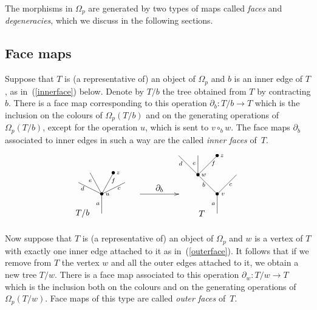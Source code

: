 \documentclass[a4paper]{amsart}
\theoremstyle{plain}
\theoremstyle{definition}
\theoremstyle{remark}
\newcommand{\rpd}{\Omega_p}
\newcommand{\To}{\longrightarrow}
\numberwithin{equation}{section}
\numberwithin{figure}{section}
\begin{document}
The morphisms in $\rpd$ are generated by two types of maps called \emph{faces} and
\emph{degeneracies}, which we discuss in the following sections.

\subsection{Face maps} Suppose that $T$ is (a representative of) an object of $\rpd$ and
$b$ is an inner edge of $T$, as in~(\ref{innerface}) below. Denote by $T/b$ the tree obtained from $T$ by contracting
$b$. There is a face map corresponding to this operation $\partial_b:T/b\To T$ which is the inclusion on the colours of $\Omega_p(T/b)$
and on the generating operations of $\Omega_p(T/b)$, except for the operation  $u$, which is sent to $v\circ_b w$.
The face maps $\partial_b$ associated to inner edges in such a way are the called \emph{inner faces} of~$T$.

\begin{equation}
    \xy<0.08cm,0cm>:
    (-12,-4)*=0{}="t1";
    (-6,1)*=0{}="t2";
    (6,1)*=0{\bullet}="t3";
    (12,-4)*=0{}="t4";
    (0,-10)*=0{\bullet}="t5";
    (0,-20)*=0{}="t6";
    (40,10)*=0{}="5";
    (50,10)*=0{}="6";
    (60,10)*=0{\bullet}="7";
    (50,0)*=0{\bullet}="8";
    (70,0)*=0{}="9";
    (60,-10)*=0{\bullet}="10";
    (60,-20)*=0{}="11";
    (-10,-7)*{\scriptstyle d};
    (-6,-3)*{\scriptstyle e};
    (6,-3)*{\scriptstyle f};
    (9,-7)*{\scriptstyle c};
    (-2,-15)*{\scriptstyle a};
    (3,-10)*{\scriptstyle u};
    (41,6)*{\scriptstyle d};
    (48,6)*{\scriptstyle e};
    (58,6)*{\scriptstyle f};
    (53,-5)*{\scriptstyle b};
    (67,-5)*{\scriptstyle c};
    (63,-10)*{\scriptstyle v};
    (58,-15)*{\scriptstyle a};
    (53,0)*{\scriptstyle w};
    (30,-7)*{\partial_b};
    (8.5,1)*{\scriptstyle z};
    (62.5,10)*{\scriptstyle z};
    (-10,-20)*=0{T/b};
    (52,-20)*=0{T};
    (-10,-25)*=0{};
    "t1";"t5" **\dir{-};
    "t2";"t5" **\dir{-};
    "t3";"t5" **\dir{-};
    "t4";"t5" **\dir{-};
    "t5";"t6" **\dir{-};
    "5";"8" **\dir{-};
    "6";"8" **\dir{-};
    "7";"8" **\dir{-};
    "8";"10" **\dir{-};
    "9";"10" **\dir{-};
    "10";"11" **\dir{-};
    {\ar(20, -10)*{};(40,-10)*{}};
    \endxy
    \label{innerface}
\end{equation}


Now suppose that $T$ is (a representative of) an object of $\rpd$ and $w$ is a vertex of $T$ with exactly one inner edge
attached to it as in~(\ref{outerface}). It follows that if we remove from $T$ the vertex $w$ and all the outer edges
attached to it, we obtain a new tree $T/w$. There is a face map associated to this operation $\partial_w:T/w\To T$ which is
the inclusion both on the colours and on the generating operations of $\Omega_p(T/w)$. Face maps of this type are called \emph{outer faces} of~$T$.
\end{document}

